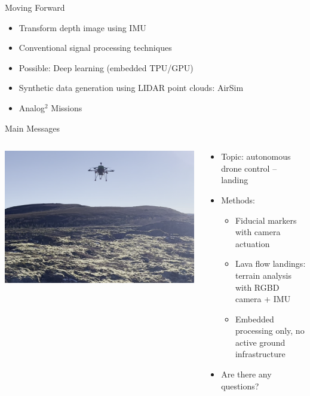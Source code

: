 \documentclass[aspectratio=169]{beamer}
\begin{document}

\begin{frame}{Moving Forward}
	\begin{itemize}
		\item Transform depth image using IMU
		\item Conventional signal processing techniques
		\item Possible: Deep learning (embedded TPU/GPU)
		\item Synthetic data generation using LIDAR point clouds: AirSim
		\item Analog$^2$ Missions
	\end{itemize}
\end{frame}

\begin{frame}{Main Messages}
\begin{columns}
	\begin{column}{0.4\textwidth}
		\includegraphics[width=\textwidth]{./images/depth_drone_flying}
	\end{column}
	\begin{column}{0.6\textwidth}
	\begin{itemize}
		\item Topic: autonomous drone control -- landing
		\item Methods:
		\begin{itemize}
			\item Fiducial markers with camera actuation
			\item Lava flow landings: terrain analysis with RGBD camera + IMU
			\item Embedded processing only, no active ground infrastructure
		\end{itemize}
	\item Are there any questions?
	\end{itemize}
	\end{column}
\end{columns}
\end{frame}

%	
%	
\end{document}
